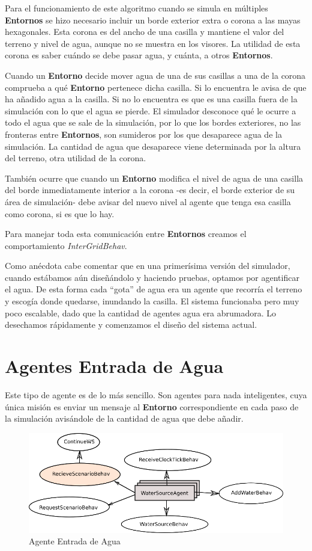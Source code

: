 Para el funcionamiento de este algoritmo cuando se simula en múltiples {\bf
Entornos} se hizo necesario incluir un borde exterior extra o corona a las mayas
hexagonales. Esta corona es del ancho de una casilla y mantiene el valor del
terreno y nivel de agua, aunque no se muestra en los visores. La utilidad de
esta corona es saber cuándo se debe pasar agua, y cuánta, a otros {\bf
Entornos}.

Cuando un {\bf Entorno} decide mover agua de una de sus casillas a una de la
corona comprueba a qué {\bf Entorno} pertenece dicha casilla. Si lo encuentra
le avisa de que ha añadido agua a la casilla. Si no lo encuentra es que es una
casilla fuera de la simulación con lo que el agua se pierde. El simulador
desconoce qué le ocurre a todo el agua que se sale de la simulación, por lo que
los bordes exteriores, no las fronteras entre {\bf Entornos}, son sumideros por
los que desaparece agua de la simulación. La cantidad de agua que desaparece
viene determinada por la altura del terreno, otra utilidad de la corona.

También ocurre que cuando un {\bf Entorno} modifica el nivel de agua de una
casilla del borde inmediatamente interior a la corona -es decir, el borde
exterior de su área de simulación- debe avisar del nuevo nivel al agente que
tenga esa casilla como corona, si es que lo hay.

Para manejar toda esta comunicación entre {\bf Entornos} creamos el
comportamiento {\em InterGridBehav}.

Como anécdota cabe comentar que en una primerísima versión del simulador,
cuando estábamos aún diseñándolo y haciendo pruebas, optamos por agentificar el
agua. De esta forma cada ``gota'' de agua era un agente que recorría el terreno
y escogía donde quedarse, inundando la casilla. El sistema funcionaba pero muy
poco escalable, dado que la cantidad de agentes agua era abrumadora. Lo
desechamos rápidamente y comenzamos el diseño del sistema actual.

\section{Agentes Entrada de Agua}

Este tipo de agente es de lo más sencillo. Son agentes para nada inteligentes,
cuya única misión es enviar un mensaje al {\bf Entorno} correspondiente en cada
paso de la simulación avisándole de la cantidad de agua que debe añadir.

\begin{figure}[H]
 \centering
 \includegraphics[width=120mm]{figuras/cap5/ag_water_source.png}
 \caption{Agente Entrada de Agua}
\end{figure}

